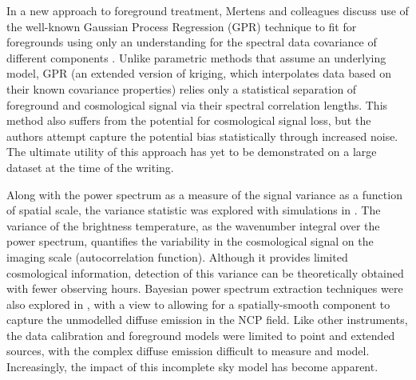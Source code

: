 In a new approach to foreground treatment, Mertens and colleagues discuss use of the well-known Gaussian Process Regression (GPR) technique to fit for foregrounds using only an understanding for the spectral data covariance of different components \cite{2018MNRAS.478.3640M}. Unlike parametric methods that assume an underlying model, GPR (an extended version of kriging, which interpolates data based on their known covariance properties) relies only a statistical separation of foreground and cosmological signal via their spectral correlation lengths. This method also suffers from the potential for cosmological signal loss, but the authors attempt capture the potential bias statistically through increased noise. The ultimate utility of this approach has yet to be demonstrated on a large dataset at the time of the writing.

Along with the power spectrum as a measure of the signal variance as a function of spatial scale, the variance statistic was explored with simulations in \cite{2014MNRAS.443.1113P}. The variance of the brightness temperature, as the wavenumber integral over the power spectrum, quantifies the variability in the cosmological signal on the imaging scale (autocorrelation function). Although it provides limited cosmological information, detection of this variance can be theoretically obtained with fewer observing hours. Bayesian power spectrum extraction techniques were also explored in \cite{2015MNRAS.452.1587G}, with a view to allowing for a spatially-smooth component to capture the unmodelled diffuse emission in the NCP field. Like other instruments, the data calibration and foreground models were limited to point and extended sources, with the complex diffuse emission difficult to measure and model. Increasingly, the impact of this incomplete sky model has become apparent.

